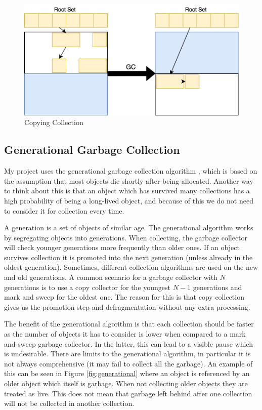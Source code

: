 \documentclass[../diss.tex]{subfiles}
\begin{document}
\begin{figure}
    \centering
    \includegraphics[max width=\linewidth]{figs/copycollection.png}
    \caption{Copying Collection}
    \label{fig:copyingcollection}
\end{figure}

\subsection{Generational Garbage Collection} \label{sec:generationalgarbagecollection}

My project uses the generational garbage collection algorithm \cite{generational}, which is based on the assumption that most objects die shortly after being allocated. Another way to think about this is that an object which has survived many collections has a high probability of being a long-lived object, and because of this we do not need to consider it for collection every time.

A generation is a set of objects of similar age. The generational algorithm works by segregating objects into generations. When collecting, the garbage collector will check younger generations more frequently than older ones. If an object survives collection it is promoted into the next generation (unless already in the oldest generation). Sometimes, different collection algorithms are used on the new and old generations. A common scenario for a garbage collector with $N$ generations is to use a copy collector for the youngest $N-1$ generations and mark and sweep for the oldest one. The reason for this is that copy collection gives us the promotion step and defragmentation without any extra processing.

The benefit of the generational algorithm is that each collection should be faster as the number of objects it has to consider is lower when compared to a mark and sweep garbage collector. In the latter, this can lead to a visible pause which is undesirable. There are limits to the generational algorithm, in particular it is not always comprehensive (it may fail to collect all the garbage). An example of this can be seen in Figure \ref{fig:generational} where an object is referenced by an older object which itself is garbage. When not collecting older objects they are treated as live. This does not mean that garbage left behind after one collection will not be collected in another collection.
\end{document}
